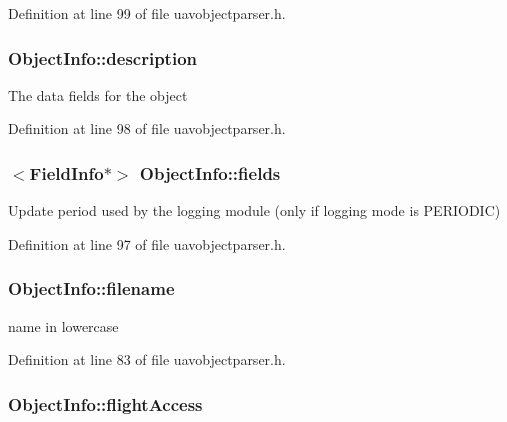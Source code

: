 Definition at line 99 of file uavobjectparser.\-h.

\hypertarget{struct_object_info_a4127c29ce714495caadda910f8fc0abe}{
\subsubsection[{description}]{ Object\-Info\-::description}}\label{struct_object_info_a4127c29ce714495caadda910f8fc0abe}
The data fields for the object 

Definition at line 98 of file uavobjectparser.\-h.

\hypertarget{struct_object_info_a1deed82421d295df3f13868d69407cde}{
\subsubsection[{fields}]{$<${\bf Field\-Info}$\ast$$>$ Object\-Info\-::fields}}\label{struct_object_info_a1deed82421d295df3f13868d69407cde}
Update period used by the logging module (only if logging mode is P\-E\-R\-I\-O\-D\-I\-C) 

Definition at line 97 of file uavobjectparser.\-h.

\hypertarget{struct_object_info_a12f0ba613130fe1bad580d7a40ae05d7}{
\subsubsection[{filename}]{ Object\-Info\-::filename}}\label{struct_object_info_a12f0ba613130fe1bad580d7a40ae05d7}
name in lowercase 

Definition at line 83 of file uavobjectparser.\-h.

\hypertarget{struct_object_info_a2cad788f09c3a692fe7c12dcaaadd4e5}{
\subsubsection[{flight\-Access}]{ Object\-Info\-::flight\-Access}}\label{struct_object_info_a2cad788f09c3a692fe7c12dcaaadd4e5}


